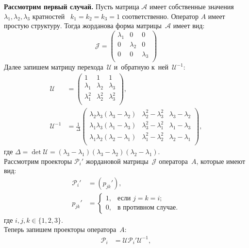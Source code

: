 \textbf{Рассмотрим первый случай.} 
Пусть матрица $\mathcal{A}$ имеет собственные значения $\lambda_1, \lambda_2, \lambda_3$ кратностей~ $k_1=k_2=k_3=1$ соответственно. Оператор $A$ имеет простую структуру. Тогда жорданова форма матрицы~$\mathcal{A}$ имеет вид:
$$
 \mathcal{J} = 
 \begin{pmatrix}
  \lambda_1 & 0 & 0\\
  0 & \lambda_2 & 0 \\
  0 & 0 & \lambda_3 \\
 \end{pmatrix}
$$
Далее запишем матрицу перехода~$\mathcal{U}$ и~обратную к~ней~$\mathcal{U}^{-1}$:
$$
\begin{aligned}
 \mathcal{U} &= 
 \begin{pmatrix}
  	1 & 1 & 1\\
  	\lambda_1 & \lambda_2 & \lambda_3 \\
  	\lambda_1^2 & \lambda_2^2 & \lambda_3^2 \\
 \end{pmatrix}, \\
 \mathcal{U}^{-1} &= \frac{1}{\Delta} 
 \begin{pmatrix}
  	\lambda_2\lambda_3(\lambda_3-\lambda_2) & \lambda_2^2-\lambda_3^2 & \lambda_3-\lambda_2\\
  	\lambda_1\lambda_3(\lambda_1-\lambda_3) & \lambda_3^2-\lambda_1^2 & \lambda_1-\lambda_3\\
  	\lambda_1\lambda_2(\lambda_2-\lambda_1) & \lambda_1^2-\lambda_2^2 & \lambda_2-\lambda_1\\
 \end{pmatrix},
\end{aligned}
$$
где $\Delta = \det \mathcal{U} = (\lambda_3-\lambda_1)(\lambda_3-\lambda_2)(\lambda_2-\lambda_1).$ \\
Рассмотрим проекторы $\mathcal{P}_i'$ жордановой матрицы~$\mathcal{J}$ оператора~$A$, которые имеют вид:
$$
\begin{aligned}
\mathcal{P}_i' &= \left(p_{jk}'\right), \\
		p_{jk}' &= 
		\begin{cases}
			1, & \text{если $j=k=i$;} \\
			0, & \text{в противном случае.}
		\end{cases}
\end{aligned}
$$
где $i,j,k \in \{1,2,3\}$.\\
Теперь запишем проекторы оператора~$A$:
$$
	\begin{aligned}
		\mathcal{P}_i &= \mathcal{U}\mathcal{P}_i'\mathcal{U}^{-1}, 
	\end{aligned}
$$
